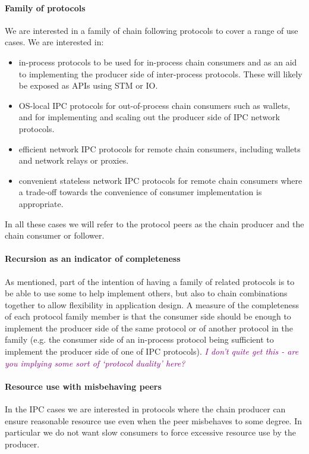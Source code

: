 \documentclass{article}
\newcommand{\njd}[1]{\textcolor{purple}{\emph{#1}}}
\theoremstyle{definition}{
  \newtheorem{lemma}{Lemma}[section] %
  \newtheorem{definition}[lemma]{Definition}
}
\theoremstyle{theorem}{
  \newtheorem{invariant}[lemma]{Invariant}
  \newtheorem{proofobligation}[lemma]{Proof Obligation}
}
\numberwithin{equation}{lemma}
\begin{document}
\paragraph{Family of protocols}
We are interested in a family of chain following protocols to cover a range of
use cases. We are interested in:
\begin{itemize}
\item in-process protocols to be used for in-process chain consumers and as an
      aid to implementing the producer side of inter-process protocols.
      These will likely be exposed as APIs using STM or IO.
\item OS-local IPC protocols for out-of-process chain consumers
      such as wallets, and for implementing and scaling out the producer side
      of IPC network protocols.
\item efficient network IPC protocols for remote chain consumers, including
      wallets and network relays or proxies.
\item convenient stateless network IPC protocols for remote chain consumers
      where a trade-off towards the convenience of consumer implementation is
      appropriate.
\end{itemize}

In all these cases we will refer to the protocol peers as the chain producer
and the chain consumer or follower.

\paragraph{Recursion as an indicator of completeness} As mentioned, part of the
intention of having a family of related protocols is to be able to use some to
help implement others, but also to chain combinations together to allow
flexibility in application design. A measure of the completeness of each
protocol family member is that the consumer side should be enough to implement
the producer side of the same protocol or of another protocol in the family
(e.g. the consumer side of an in-process protocol being sufficient to implement
the producer side of one of IPC protocols).
\njd{I don't quite get this - are you implying some sort of `protocol duality' here?}

\paragraph{Resource use with misbehaving peers}
In the IPC cases we are interested in protocols where the chain producer can
ensure reasonable resource use even when the peer misbehaves to some degree. In
particular we do not want slow consumers to force excessive resource use by the
producer.
\end{document}
